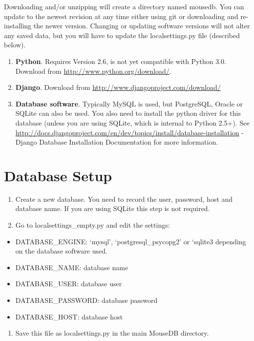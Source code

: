 \documentclass[letterpaper,10pt,english]{sphinxmanual}
\begin{document}
Downloading and/or unzipping will create a directory named mousedb.  You can update to the newest revision at any time either using git or downloading and re-installing the newer version.  Changing or updating software versions will not alter any saved data, but you will have to update the localsettings.py file (described below).
\begin{enumerate}
\item {} 
\textbf{Python}.  Requires Version 2.6, is not yet compatible with Python 3.0.  Download from \href{http://www.python.org/download/}{http://www.python.org/download/}.

\item {} 
\textbf{Django}.  Download from \href{http://www.djangoproject.com/download/}{http://www.djangoproject.com/download/}

\item {} 
\textbf{Database software}.  Typically MySQL is used, but PostgreSQL, Oracle or SQLite can also be used.  You also need to install the python driver for this database (unless you are using SQLite, which is internal to Python 2.5+).  See \href{http://docs.djangoproject.com/en/dev/topics/install/database-installation}{http://docs.djangoproject.com/en/dev/topics/install/database-installation} - Django Database Installation Documentation for more information.

\end{enumerate}


\section{Database Setup}
\begin{enumerate}
\item {} 
Create a new database.  You need to record the user, password, host and database name.  If you are using SQLite this step is not required.

\item {} 
Go to localsettings\_empty.py and edit the settings:

\end{enumerate}
\begin{itemize}
\item {} 
DATABASE\_ENGINE: `mysql', `postgresql\_psycopg2' or `sqlite3 depending on the database software used.

\item {} 
DATABASE\_NAME: database name

\item {} 
DATABASE\_USER: database user

\item {} 
DATABASE\_PASSWORD: database password

\item {} 
DATABASE\_HOST: database host

\end{itemize}
\begin{enumerate}
\item {} 
Save this file as localsettings.py in the main MouseDB directory.

\end{enumerate}
\end{document}
